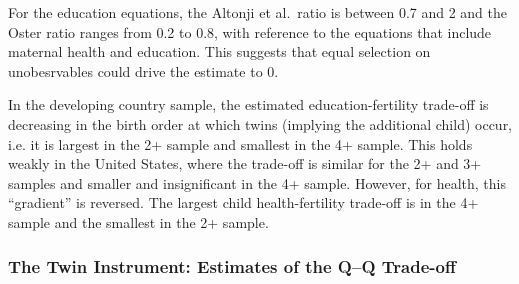\documentclass[subeqn]{article}
\begin{document}
\begin{spacing}{1.4}
For the education equations, the Altonji et al.\ ratio is between 0.7 and 2 and the Oster ratio ranges from 0.2 to 0.8, with reference to the equations that include maternal health and education.
This suggests that equal selection on unobesrvables could drive the estimate to 0.  

In the developing country sample, the estimated education-fertility trade-off is decreasing in the birth order at which twins (implying the additional child) occur, i.e. it is largest in the 2+ sample and smallest in the 4+ sample. This holds weakly in the United States, where the trade-off is similar for the 2+ and 3+ samples and smaller and insignificant in the 4+ sample. However, for health, this "`gradient"' is reversed. The largest child health-fertility trade-off is in the 4+ sample and the smallest in the 2+ sample.

\subsubsection{The Twin Instrument: Estimates of the Q--Q Trade-off} \label{TWINsscn:QQtwinsIV}


\end{spacing}
\end{document}
